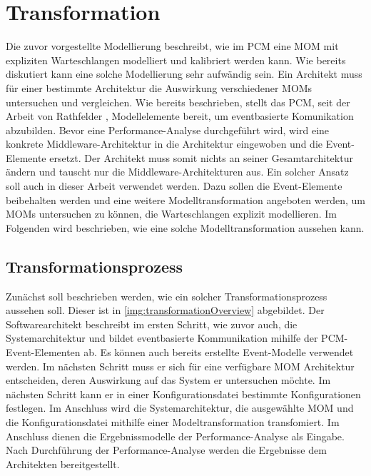 
\chapter{Transformation}
\label{ch:transformation}
Die zuvor vorgestellte Modellierung beschreibt, wie im PCM eine MOM mit expliziten Warteschlangen modelliert und kalibriert werden kann. Wie bereits diskutiert kann eine solche Modellierung sehr aufwändig sein. Ein Architekt muss für einer bestimmte Architektur die Auswirkung verschiedener MOMs untersuchen und vergleichen. Wie bereits beschrieben, stellt das PCM, seit der Arbeit von Rathfelder \cite{Rathfelder2013}, Modellelemente bereit, um eventbasierte Komunikation abzubilden. Bevor eine Performance-Analyse durchgeführt wird, wird eine konkrete Middleware-Architektur in die Architektur eingewoben und die Event-Elemente ersetzt. Der Architekt muss somit nichts an seiner Gesamtarchitektur ändern und tauscht nur die Middleware-Architekturen aus. Ein solcher Ansatz soll auch in dieser Arbeit verwendet werden. Dazu sollen die Event-Elemente beibehalten werden und eine weitere Modelltransformation angeboten werden, um MOMs untersuchen zu können, die Warteschlangen explizit modellieren. Im Folgenden wird beschrieben, wie eine solche Modelltransformation aussehen kann.
\section{Transformationsprozess}
Zunächst soll beschrieben werden, wie ein solcher Transformationsprozess aussehen soll. Dieser ist in \autoref{img:transformationOverview} abgebildet. Der Softwarearchitekt beschreibt im ersten Schritt, wie zuvor auch, die Systemarchitektur und bildet eventbasierte Kommunikation mihilfe der PCM-Event-Elementen ab. Es können auch bereits erstellte Event-Modelle verwendet werden. Im nächsten Schritt muss er sich für eine verfügbare MOM Architektur entscheiden, deren Auswirkung auf das System er untersuchen möchte. Im nächsten Schritt kann er in einer Konfigurationsdatei bestimmte Konfigurationen festlegen. Im Anschluss wird die Systemarchitektur, die ausgewählte MOM und die Konfigurationsdatei mithilfe einer Modeltransformation transfomiert. Im Anschluss dienen die Ergebnissmodelle der Performance-Analyse als Eingabe. Nach Durchführung der Performance-Analyse werden die Ergebnisse dem Architekten bereitgestellt.

